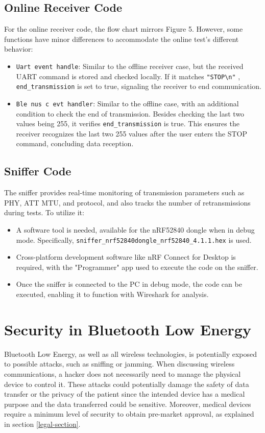 \documentclass{Configuration_Files/PoliMi3i_thesis}
\begin{document}
\subsection*{Online Receiver Code}
For the online receiver code, the flow chart mirrors Figure 5. However, some functions have minor differences to accommodate the online test's different behavior:
\begin{itemize}
    \item \texttt{Uart event handle}: Similar to the offline receiver case, but the received UART command is stored and checked locally. If it matches \texttt{"STOP\textbackslash n"}
    , \texttt{end\_transmission} is set to true, signaling the receiver to end communication.
    \item \texttt{Ble nus c evt handler}: Similar to the offline case, with an additional condition to check the end of transmission. Besides checking the last two values being 255, it verifies \texttt{end\_transmission} is true. This ensures the receiver recognizes the last two 255 values after the user enters the STOP command, concluding data reception.
\end{itemize}

\subsection*{Sniffer Code}
The sniffer provides real-time monitoring of transmission parameters such as PHY, ATT MTU, and protocol, and also tracks the number of retransmissions during tests. To utilize it:
\begin{itemize}
    \item A software tool is needed, available for the nRF52840 dongle when in debug mode. Specifically, \texttt{sniffer\_nrf52840dongle\_nrf52840\_4.1.1.hex} is used.
    \item Cross-platform development software like nRF Connect for Desktop is required, with the "Programmer" app used to execute the code on the sniffer.
    \item Once the sniffer is connected to the PC in debug mode, the code can be executed, enabling it to function with Wireshark for analysis.
\end{itemize}


\section{Security in Bluetooth Low Energy}

Bluetooth Low Energy, as well as all wireless technologies, is potentially exposed to possible attacks, such as sniffing or jamming. When discussing wireless communications, a hacker does not necessarily need to manage the physical device to control it. These attacks could potentially damage the safety of data transfer or the privacy of the patient since the intended device has a medical purpose and the data transferred could be sensitive. Moreover, medical devices require a minimum level of security to obtain pre-market approval, as explained in section \ref{legal-section}.
\end{document}
